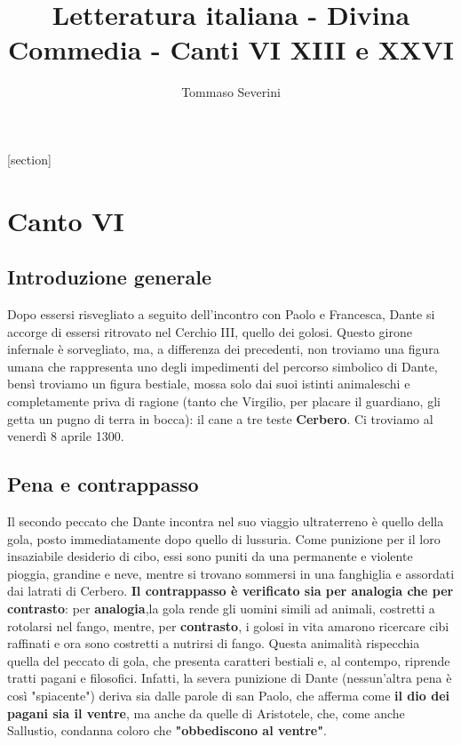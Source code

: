 \documentclass[10pt,a4paper]{article}
\author{Tommaso Severini}
\title{Letteratura italiana - Divina Commedia - Canti VI XIII e XXVI}
\begin{document}
	\maketitle
	
	\tableofcontents
	
	[section]
	
	\section{Canto VI}
	
	\subsection{Introduzione generale}
	
	Dopo essersi risvegliato a seguito dell'incontro con Paolo e Francesca, Dante si accorge di essersi ritrovato nel Cerchio III, quello dei golosi. Questo girone infernale è sorvegliato, ma, a differenza dei precedenti, non troviamo una figura umana che rappresenta uno degli impedimenti del percorso simbolico di Dante, bensì troviamo un figura bestiale, mossa solo dai suoi istinti animaleschi e completamente priva di ragione (tanto che Virgilio, per placare il guardiano, gli getta un pugno di terra in bocca): il cane a tre teste \textbf{Cerbero}. Ci troviamo al venerdì 8 aprile 1300.
	
	\subsection{Pena e contrappasso}
	
	Il secondo peccato che Dante incontra nel suo viaggio ultraterreno è quello della gola, posto immediatamente dopo quello di lussuria. Come punizione per il loro insaziabile desiderio di cibo, essi sono puniti da una permanente e violente pioggia, grandine e neve, mentre si trovano sommersi in una fanghiglia e assordati dai latrati di Cerbero. \textbf{Il contrappasso è verificato sia per analogia che per contrasto}: per \textbf{analogia},la gola rende gli uomini simili ad animali, costretti a rotolarsi nel fango, mentre, per \textbf{contrasto}, i golosi in vita amarono ricercare cibi raffinati e ora sono costretti a nutrirsi di fango. Questa animalità rispecchia quella del peccato di gola, che presenta caratteri bestiali e, al contempo, riprende tratti pagani e filosofici. Infatti, la severa punizione di Dante (nessun'altra pena è così "spiacente") deriva sia dalle parole di san Paolo, che afferma come \textbf{il dio dei pagani sia il ventre}, ma anche da quelle di Aristotele, che, come anche Sallustio, condanna coloro che \textbf{"obbediscono al ventre"}.
	
\end{document}
